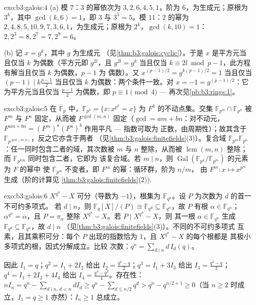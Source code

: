 \begin{solution}{exo:b3:galois:4}
(a) 模 $7$：$3$ 的幂依次为 $3, 2, 6, 4, 5, 1$，阶为
$6$，为生成元；原根为 $3^k$，其中
$\gcd(k, 6) = 1$，即 $3$ 与 $3^5 = 5$。模 $11$：$2$ 的幂为
$2, 4, 8, 5, 10, 9, 7, 3, 6, 1$，为生成元；原根为
$2^k$，$\gcd(k, 10) = 1$：$2, 2^3 = 8, 2^7 = 7, 2^9 = 6$。

(b) 记 $x = g^k$，其中 $g$ 为生成元
（见\cref{thm:b3:galois:cyclic}）。于是 $x$ 是平方元当且仅当 $k$
为偶数（平方元即 $g^{2l}$，且 $g^{2l} = g^{k}$ 当且仅当 $k
\equiv 2l \bmod p-1$，此方程有解当且仅当 $k$ 为偶数，$p - 1$ 为
偶数）。又 $x^{(p-1)/2} = g^{k(p-1)/2} = 1$ 当且仅当 $(p-1) \mid
k\frac{p-1}2$ 当且仅当 $k$ 为偶数：两个条件一致。对 $x =
-1 = g^{(p-1)/2}$：它为平方元当且仅当 $\frac{p-1}2$ 为偶数，即
$p \equiv 1 \pmod 4$ --- 再次见\cref{pb:b3:rings:1}。
\end{solution}

\begin{solution}{exo:b3:galois:5}
在 $\bar{\mathbb F}_p$ 中，$\mathbb F_{p^k} = \{x : x^{p^k} =
x\}$ 为 $F^k$ 的不动点集。交集 $\mathbb F_{p^m}
\cap \mathbb F_{p^n}$ 被 $F^m$ 与 $F^n$ 固定，从而被
$F^{\gcd(m,n)}$ 固定（$\gcd = am + bn$：对不动元，$F^{am +
bn} = (F^m)^a(F^n)^b$ 作用平凡 --- 指数可取为
正数，由周期性）；故其含于 $\mathbb
F_{p^{\gcd(m,n)}}$，反之它亦含于两者
（见\cref{thm:b3:galois:finitefields}(3)）。复合域 $\mathbb
F_{p^m}\mathbb F_{p^n}$：任一同时包含二者的域，其次数被
$m$ 与 $n$ 整除，从而被 $\operatorname{lcm}(m,n)$ 整除；而
$\mathbb F_{p^{\operatorname{lcm}}}$ 同时包含二者，它即为
该复合域。若 $m \mid n$，则 $\operatorname{Gal}(\mathbb
F_{p^n}/\mathbb F_{p^m})$ 的元素为 $F$ 的幂中
使 $\mathbb F_{p^m}$ 不变者，即 $F^m$ 的幂：循环群，阶为 $n/m$，
由 $F^m \colon x \mapsto x^{p^m}$ 生成（阶的计算见
\cref{thm:b3:galois:finitefields}(2)).
\end{solution}

\begin{solution}{exo:b3:galois:6}
$X^{q^n} - X$ 可分（导数为 $-1$），根集为
$\mathbb F_{q^n}$。设 $P$ 为次数为 $d$ 的首一不可约多项式。
若 $d \mid n$，则 $\mathbb F_q[X]/(P) \cong \mathbb F_{q^d}
\subseteq \mathbb F_{q^n}$，故 $P$ 有根 $\alpha \in
\mathbb F_{q^n}$；$\alpha^{q^n} = \alpha$，且 $P =
\pi_\alpha$ 整除 $X^{q^n} - X$。若 $P \mid X^{q^n} - X$，则
其一根 $\alpha \in \mathbb F_{q^n}$ 生成 $\mathbb F_{q^d}
\subseteq \mathbb F_{q^n}$，故 $d \mid n$
（见\cref{thm:b3:galois:finitefields}(3)）。不同的不可约多项式
互素，且其乘积可分：每个 $P$ 出现的指数恰为
$1$，且 $X^{q^n}-X$ 的每个根都是
其极小多项式的根，因式分解成立。比较
次数：$q^n = \sum_{d\mid n} d\,I_d(q)$。

因此 $I_1 = q$；$q^2 = I_1 + 2I_2$ 给出 $I_2 =
\frac{q^2 - q}2$；$q^3 = I_1 + 3I_3$ 给出 $I_3 = \frac{q^3 -
q}3$；$q^4 = I_1 + 2I_2 + 4I_4$ 给出 $I_4 = \frac{q^4 -
q^2}4$。存在性：$nI_n = q^n - \sum_{d \mid n,\, d < n}
dI_d \geq q^n - \sum_{d \leq n/2} q^d > q^n - q^{n/2 + 1} \geq
0$（当 $n \geq 2$ 时成立，$I_1 = q \geq 1$ 亦然）：$I_n \geq 1$ 总成立。
\end{solution}

